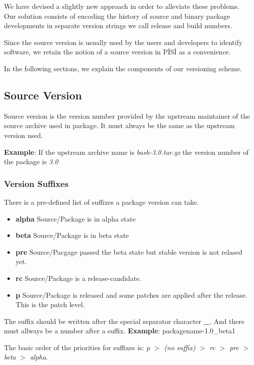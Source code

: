 \documentclass[a4paper,11pt]{article}
\begin{document}
We have devised a slightly new approach in order to alleviate these
problems. Our solution consists of encoding the history of source and
binary package developments in separate version strings we call release and
build numbers.

Since the source version is usually used by the users and developers
to identify software, we retain the notion of a source version in
P\.IS\.I as a convenience. 

In the following sections, we explain the components of our
versioning scheme.

\subsection{Source Version}

Source version is the version number provided by the
upstream maintainer of the source archive used in package. It must 
always be the same as the upstream version used.

\textbf{Example}: If the upstream archive name is
\emph{bash-3.0.tar.gz} the version number of the package is \emph{3.0}

\subsubsection{Version Suffixes}

There is a pre-defined list of suffixes a package version can
take.

\begin{itemize}
  \item \textbf{alpha} Source/Package is in alpha state
  \item \textbf{beta} Source/Package is in beta state
  \item \textbf{pre} Source/Pacgage passed the beta state but stable
    version is not relased yet.
  \item \textbf{rc} Source/Package is a release-candidate.
  \item \textbf{p} Source/Package is released and some patches are
    applied after the release. This is the patch level.
\end{itemize}

The suffix should be written after the special separator
character \textbf{\_}. And there must allways be a number after a
suffix. \textbf{Example}: packagename-1.0\_beta1

The basic order of the priorities for suffixes is:\newline
\emph{p $>$ (no suffix) $>$ rc $>$ pre $>$ beta $>$ alpha}.
\end{document}
